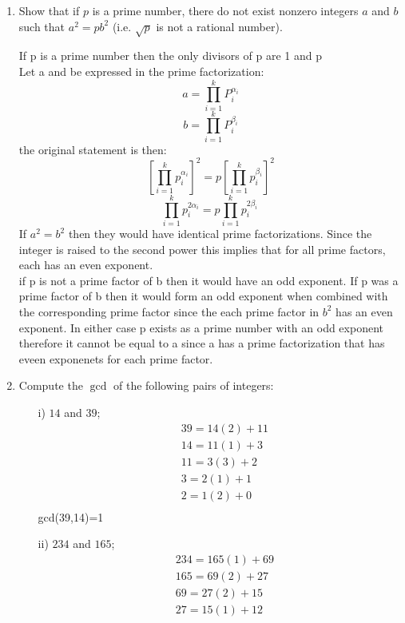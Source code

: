 \documentclass[11pt]{article}
\theoremstyle{definition}  %
\begin{document}
\begin{enumerate}
\begin{proof}
\begin{align*}
  &\text{ Which implies }\\
  &(1 + x)^n-1\geq nx
\end{align*}
\end{proof}
\item Show that if $p$ is a prime number, there do not exist nonzero integers $a$ and $b$ such that $a^2 = pb^2$ (i.e. $\sqrt{p}$ is not a rational number).\\
\begin{Proof} If p is a prime number then the only divisors of p are 1 and p\\
Let a and be expressed in the prime factorization:
\[
  a=\prod_{i=1}^kP_i^{\alpha_i}
\]
\[
  b=\prod_{i=1}^kP_i^{\beta_i}
\]
the original statement is then:
\[
  \left[\prod_{i=1}^kp_i^{\alpha_i}\right]^2=p\left[\prod_{i=1}^kp_i^{\beta_i}\right]^2
\]
\[
  \prod_{i=1}^kp_i^{2\alpha_i}=p\prod_{i=1}^kp_i^{2\beta_i}\
\]
If $a^2=b^2$ then they would have identical prime factorizations. Since the integer is raised to the second power this implies that for all prime factors, each has an even exponent. \\
if p is not a prime factor of b then it would have an odd exponent. If p was a prime factor of b then it would form an odd exponent when combined with the corresponding prime factor since the each prime factor in $b^2$ has an even exponent.  In either case p exists as a prime number with an odd exponent therefore it cannot be equal to a since a has a prime factorization that has eveen exponenets for each prime factor.
\end{Proof}
\item Compute the $\gcd$ of the following pairs of integers:
  \begin{itemize}
  \item[i)] $14$ and $39$;
  \begin{align*}
    &39=14(2)+11\\
    &14=11(1)+3\\
    &11=3(3)+2\\
    &3=2(1)+1\\
    &2=1(2)+0\\
  \end{align*}
    gcd(39,14)=1
  \item[ii)] $234$ and $165$;
  \begin{align*}
  &234=165(1)+69\\
  &165=69(2)+27\\
  &69=27(2)+15\\
  &27=15(1)+12\\

\end{align*}
\end{itemize}
\end{enumerate}
\end{document}
